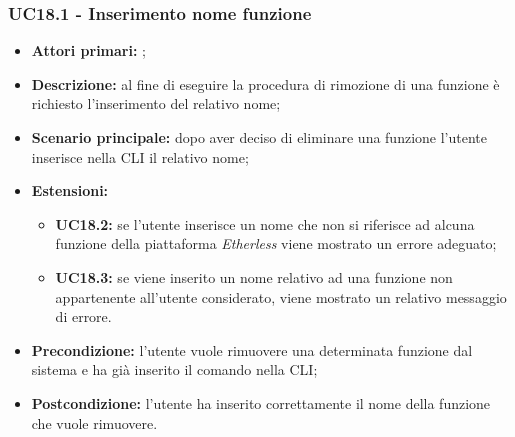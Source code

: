 \subsubsection{UC18.1 - Inserimento nome funzione}
\begin{itemize}
	\item \textbf{Attori primari:} \us{};
	\item \textbf{Descrizione:} al fine di eseguire la procedura di rimozione di una funzione è richiesto l’inserimento del relativo nome; 
	\item \textbf{Scenario principale:} dopo aver deciso di eliminare una funzione l’utente inserisce nella CLI il relativo nome; 
	\item \textbf{Estensioni:} 
	\begin{itemize}
		\item \textbf{UC18.2:} se l’utente inserisce un nome che non si riferisce ad alcuna funzione della piattaforma \textit{Etherless} viene mostrato un errore adeguato;  
		\item \textbf{UC18.3:} se viene inserito un nome relativo ad una funzione non appartenente all’utente considerato, viene mostrato un relativo messaggio di errore. 
	\end{itemize}
	\item \textbf{Precondizione:} l’utente vuole rimuovere una determinata funzione dal sistema e ha già inserito il comando \delete{} nella CLI;  
	\item \textbf{Postcondizione:} l’utente ha inserito correttamente il nome della funzione che vuole rimuovere.  
\end{itemize}